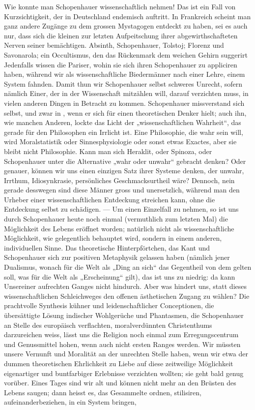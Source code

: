 Wie konnte man Schopenhauer wissenschaftlich nehmen! Das ist ein Fall von Kurzsichtigkeit, der in Deutschland endemisch auftritt. In Frankreich scheint man ganz andere Zugänge zu dem grossen Mystagogen entdeckt zu haben, sei es auch nur, dass sich die kleinen  zur letzten Aufpeitschung ihrer abgewirthschafteten Nerven seiner bemächtigen. Absinth, Schopenhauer, Tolstoj; Florenz und Savonarola; ein Occultismus, den das Rückenmark dem weichen Gehirn suggerirt  Jedenfalls wissen die Pariser, wohin sie sich ihren Schopenhauer zu appliciren haben, während wir als wissenschaftliche Biedermänner nach einer Lehre, einem System fahnden. Damit thun wir Schopenhauer selbst schweres Unrecht, sofern nämlich Einer, der in der Wissenschaft mitzählen will, darauf verzichten muss, in vielen anderen Dingen in Betracht zu kommen. Schopenhauer missverstand sich selbst, und zwar in  , wenn er sich für einen theoretischen Denker hielt; auch ihn, wie manchen Anderen, lockte das Licht der „wissenschaftlichen Wahrheit“, das gerade für den Philosophen ein Irrlicht ist. Eine Philosophie, die wahr sein will, wird Moralstatistik oder Sinnesphysiologie oder sonst etwas Exactes, aber sie bleibt nicht Philosophie. Kann man sich Heraklit, oder Spinoza, oder Schopenhauer unter die Alternative „wahr oder unwahr“ gebracht denken? Oder genauer, können wir uns einen einzigen Satz ihrer Systeme denken, der  unwahr, Irrthum, Idiosynkrasie, persönliches Geschmacksurtheil wäre? Dennoch, nein gerade desswegen sind diese Männer gross und unersetzlich, während man den Urheber einer wissenschaftlichen Entdeckung streichen kann, ohne die Entdeckung selbst zu schädigen. — Um einen Einzelfall zu nehmen, so ist uns durch Schopenhauer heute noch einmal (vermuthlich zum letzten Mal) die Möglichkeit des  Lebens eröffnet worden; natürlich nicht als wissenschaftliche Möglichkeit, wie gelegentlich behauptet wird, sondern in einem anderen, individuellen Sinne. Das theoretische Hinterpförtchen, das Kant und Schopenhauer sich zur positiven Metaphysik gelassen haben (nämlich jener Dualismus, wonach für die Welt als „Ding an sich“ das Gegentheil von dem gelten soll, was für die Welt als „Erscheinung“ gilt), das ist uns zu niedrig: da kann Unsereiner aufrechten Ganges nicht hindurch. Aber was hindert uns, statt dieses wissenschaftlichen Schleichweges den offenen ästhetischen Zugang zu wählen? Die prachtvolle Synthesis kühner und leidenschaftlicher Conceptionen, die übersättigte Lösung indischer Wohlgerüche und Phantasmen, die Schopenhauer an Stelle des europäisch verflachten, moralverdünnten Christenthums darzureichen weiss, lässt uns die Religion noch einmal zum Erregungscentrum und Genussmittel hohen, wenn auch nicht ersten Ranges werden. Wir müssten unsere Vernunft und Moralität an der unrechten Stelle haben, wenn wir etwa der dummen theoretischen Ehrlichkeit zu Liebe auf diese zeitweilige Möglichkeit eigenartiger und buntfarbiger Erlebnisse verzichten wollten; sie geht bald genug vorüber. Eines Tages sind wir alt und können nicht mehr an den Brüsten des Lebens saugen; dann heisst es, das Gesammelte ordnen, stilisiren, aufeinanderbeziehen, in ein System bringen, 